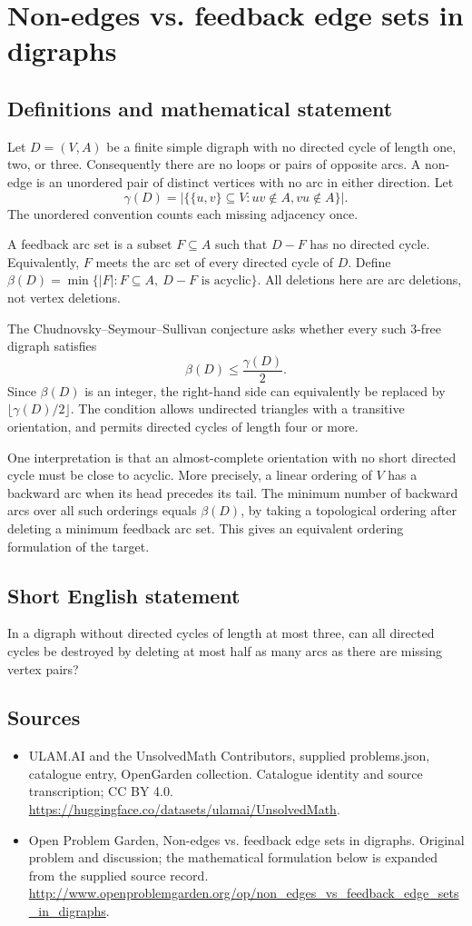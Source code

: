 \documentclass[11pt,a4paper]{article}
\begin{document}
\section*{Non-edges vs. feedback edge sets in digraphs}\label{statement}

\subsection{Definitions and mathematical statement}
Let $D=(V,A)$ be a finite simple digraph with no directed cycle of length
one, two, or three. Consequently there are no loops or pairs of opposite
arcs. A non-edge is an unordered pair of distinct vertices with no arc
in either direction. Let
\[
 \gamma(D)=\bigl|\{\{u,v\}\subseteq V:uv\notin A, vu\notin A\}\bigr|.
\]
The unordered convention counts each missing adjacency once.

A feedback arc set is a subset $F\subseteq A$ such that $D-F$ has no
directed cycle. Equivalently, $F$ meets the arc set of every directed
cycle of $D$. Define
$\beta(D)=\min\{|F|:F\subseteq A,\ D-F\text{ is acyclic}\}$.
All deletions here are arc deletions, not vertex deletions.

The Chudnovsky--Seymour--Sullivan conjecture asks whether every such
3-free digraph satisfies
\[
                        \beta(D)\le\frac{\gamma(D)}2.
\]
Since $\beta(D)$ is an integer, the right-hand side can equivalently be
replaced by $\lfloor\gamma(D)/2\rfloor$. The condition allows undirected
triangles with a transitive orientation, and permits directed cycles
of length four or more.

One interpretation is that an almost-complete orientation with no short
directed cycle must be close to acyclic. More precisely, a linear ordering
of $V$ has a backward arc when its head precedes its tail. The minimum
number of backward arcs over all such orderings equals $\beta(D)$,
by taking a topological ordering after deleting a minimum feedback
arc set. This gives an equivalent ordering formulation of the target.
\subsection{Short English statement}
In a digraph without directed cycles of length at most three, can all directed cycles be destroyed by deleting at most half as many arcs as there are missing vertex pairs?
\subsection{Sources}
\begin{itemize}
\item[S1] ULAM.AI and the UnsolvedMath Contributors, supplied problems.json, catalogue entry, OpenGarden collection. Catalogue identity and source transcription; CC BY 4.0.
\url{https://huggingface.co/datasets/ulamai/UnsolvedMath}.
\item[S2] Open Problem Garden, Non-edges vs. feedback edge sets in digraphs. Original problem and discussion; the mathematical formulation below is expanded from the supplied source record.
\url{http://www.openproblemgarden.org/op/non_edges_vs_feedback_edge_sets_in_digraphs}.
\end{itemize}
\end{document}
